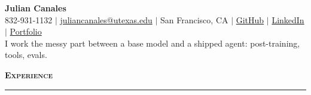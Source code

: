 \documentclass[letterpaper,10.5pt]{article}
\renewcommand{\section}[1]{%
  \vspace{0.5em}%
  {\normalsize\bfseries\scshape #1}%
  \vspace{-0.5em}%
  \par\noindent\rule{\textwidth}{0.4pt}%
  \vspace{0.15em}%
}
\begin{document}
\begin{center}
  {\large\bfseries Julian Canales} \\[2pt]
  {\small 832-931-1132 \enspace$\vert$\enspace
  \href{mailto:juliancanales@utexas.edu}{juliancanales@utexas.edu} \enspace$\vert$\enspace
  San Francisco, CA \enspace$\vert$\enspace
  \href{https://github.com/juliancanaless}{GitHub} \enspace$\vert$\enspace
  \href{https://www.linkedin.com/in/juliancanales05/}{LinkedIn} \enspace$\vert$\enspace
  \href{https://site.jc-sync.com}{Portfolio}} \\[3pt]
  {\small I work the messy part between a base model and a shipped agent: post-training, tools, evals.}\vspace{-2pt}
\end{center}

\section{Experience}
\end{document}
